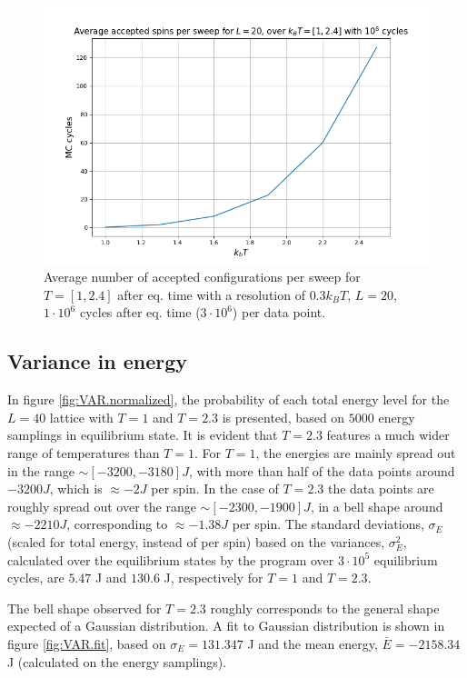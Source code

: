 \documentclass[%
oneside,                 %
final,                   %
10pt]{article}
\begin{document}
\begin{figure}[!htb]
        \centering 
         \includegraphics[scale=.55]{../Results/configs_temperature.png} 
        \caption{Average number of accepted configurations per sweep for $T=[1,2.4]$ after eq. time with a resolution of $0.3 k_B T$, $L=20$, $1 \cdot 10^6$ cycles after eq. time ($3 \cdot 10^6$) per data point.}
        \label{fig:SPIN.configs.temp}   
\end{figure} 

\subsection{Variance in energy}
\label{SS:results.VAR }
In figure \ref{fig:VAR.normalized}, the probability of each total energy level for the $L=40$ lattice with $T=1$ and $T=2.3$ is presented, based on $5000$ energy samplings in equilibrium state. It is evident that  $T=2.3$ features a much wider range of temperatures than $T=1$. For $T=1$, the energies are mainly spread out in the range $\sim [-3200,-3180] J$, with more than half of the data points around $-3200 J$, which is $\approx -2J$ per spin. In the case of $T=2.3$ the data points are roughly spread out over the range $\sim [-2300,-1900]J$, in a bell shape around $\approx -2210J$, corresponding to $\approx -1.38J$ per spin. The standard deviations, $\sigma_E$ (scaled for total energy, instead of per spin) based on the variances, $\sigma_E^2$, calculated over the equilibrium states by the program over $3 \cdot 10^5$ equilibrium cycles, are $5.47$ J and $130.6$ J, respectively for $T=1$ and $T=2.3$. \newline

The bell shape observed for $T=2.3$ roughly corresponds to the general shape expected of a Gaussian distribution. A fit to Gaussian distribution is shown in figure \ref{fig:VAR.fit}, based on $\sigma_E=131.347$ J and the mean energy, $\bar{E}=-2158.34$ J (calculated on the energy samplings). \newline
\end{document}
